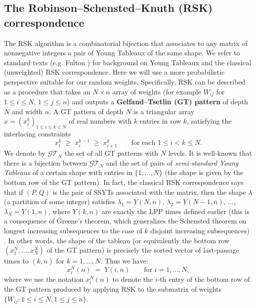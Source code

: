 \documentclass[letterpaper,11pt,oneside,reqno]{article}
\numberwithin{equation}{section}
\theoremstyle{definition}
\begin{document}
\subsection{The Robinson--Schensted--Knuth (RSK) correspondence}
The RSK algorithm is a combinatorial bijection that associates to any matrix of nonnegative integers a pair of Young Tableaux of the same shape. We refer to standard texts (e.g. Fulton \cite{Fulton1997}) for background on Young Tableaux and the classical (unweighted) RSK correspondence. Here we will use a more probabilistic perspective suitable for our random weights. Specifically, RSK can be described as a procedure that takes an $N\times n$ array of weights (for example $W_{ij}$ for $1\le i\le N,\,1\le j\le n$) and outputs a \textbf{Gelfand--Tsetlin (GT) pattern} of depth $N$ and width $n$. A GT pattern of depth $N$ is a triangular array $x=(x_i^k)_{1\le i\le k \le N}$ of real numbers with $k$ entries in row $k$, satisfying the interlacing constraints
\[ x^k_i \;\ge\; x^{k-1}_i \;\ge\; x^k_{i+1} \qquad \text{for each $1\le i < k \le N$.} \]
We denote by $\mathcal{GT}_{N}$ the set of all GT patterns with $N$ levels. It is well-known that there is a bijection between $\mathcal{GT}_N$ and the set of pairs of \emph{semi-standard Young Tableaux} of a certain shape with entries in $\{1,\dots,N\}$ (the shape is given by the bottom row of the GT pattern). In fact, the classical RSK correspondence says that if $(P,Q)$ is the pair of SSYTs associated with the matrix, then the shape $\lambda$ (a partition of some integer) satisfies $\lambda_1 = Y(N,n)$, $\lambda_2 = Y(N-1,n)$, ..., $\lambda_N = Y(1,n)$, where $Y(k,n)$ are exactly the LPP times defined earlier (this is a consequence of Greene's theorem, which generalizes the Schensted theorem on longest increasing subsequences to the case of $k$ disjoint increasing subsequences) \cite{Greene1974, Fulton1997}. In other words, the shape of the tableau (or equivalently the bottom row $(x^N_1,\dots,x^N_N)$ of the GT pattern) is precisely the sorted vector of last-passage times to $(k,n)$ for $k=1,\dots,N$. Thus we have:
\begin{equation}\label{eq:RSK-property}
x^N_i(n) \;=\; Y(i,n)\qquad \text{for $i=1,\dots,N$},
\end{equation}
where we use the notation $x^N_i(n)$ to denote the $i$-th entry of the bottom row of the GT pattern produced by applying RSK to the submatrix of weights $\{W_{ij}: 1\le i\le N, 1\le j\le n\}$.
\end{document}
